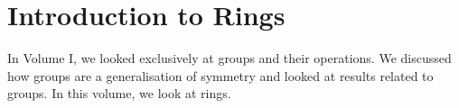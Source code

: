 
\usepackage{xr}

\newcommand{\version}{0.1}
\newcommand{\volumenumber}{2}
\newcommand{\volumename}{Rings}
\newcommand{\volumeimage}{cover/Integers Modulo n.png}

\linespread{1.05}




\newcommand{\C}{\mathbb{C}}                        %
\newcommand{\Mn}[2]{\mathcal{M}_{#1\times#1}(#2)}  %
\newcommand{\Q}{\mathbb{Q}}                        %
\newcommand{\R}{\mathbb{R}}                        %
\newcommand{\Z}{\mathbb{Z}}                        %
\newcommand{\Zn}[1]{\mathbb{Z}_{#1}}               %

\newcommand{\Char}[1]{\mathrm{char}(#1)}  %
\newcommand{\ideal}[1]{\mathfrak{#1}}     %

\newcommand{\quotepagetext}{
    [Some] of the major discoveries in ring theory have helped shape the course of development of modern abstract algebra... A course in ring theory is an indispensable part of the education of any fledgling algebraist.
}
\newcommand{\quotepageattribution}{Tsit-Yuen Lam, 2001}
\newcommand{\quotepagecitation}{\cite{lam_2001}}

\newcommand{\prefacevolumetext}{
    This volume covers the basics of ring theory. %
}
\newcommand{\prefacevolumedate}{}  %

\newcommand{\interdependencenotes}{
}


\frontmatterpages

\chapter{Introduction to Rings}
In Volume I, we looked exclusively at groups and their operations. We discussed how groups are a generalisation of symmetry and looked at results related to groups. In this volume, we look at rings.

